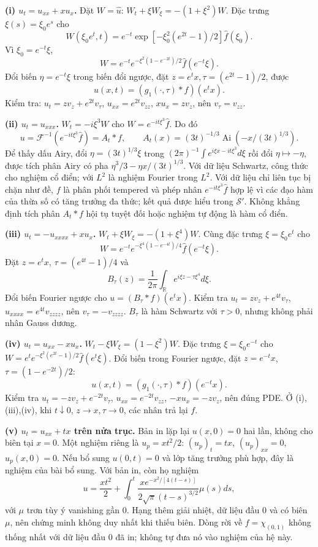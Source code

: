 \documentclass[10pt,a4paper]{article}
\begin{document}
\textbf{(i) $u_t=u_{xx}+xu_x$.}
Đặt $W=\widehat u$: $W_t+\xi W_\xi=-(1+\xi^2)W$. Đặc trưng $\xi(s)=\xi_0e^s$ cho
\[W(\xi_0e^t,t)=e^{-t}\exp[-\xi_0^2(e^{2t}-1)/2]\widehat f(\xi_0).\]
Vì $\xi_0=e^{-t}\xi$,
\[W=e^{-t}e^{-\xi^2(1-e^{-2t})/2}\widehat f(e^{-t}\xi).\]
Đổi biến $\eta=e^{-t}\xi$ trong biến đổi ngược, đặt $z=e^tx,\tau=(e^{2t}-1)/2$, được
\[u(x,t)=(g_1(\cdot,\tau)*f)(e^tx).\]
Kiểm tra: $u_t=zv_z+e^{2t}v_\tau$, $u_{xx}=e^{2t}v_{zz}$, $xu_x=zv_z$, nên $v_\tau=v_{zz}$.

\textbf{(ii) $u_t=u_{xxx}$.}
$W_t=-i\xi^3W$ cho $W=e^{-it\xi^3}\widehat f$. Do đó
\[u=\mathcal F^{-1}(e^{-it\xi^3}\widehat f)=A_t*f,\qquad
A_t(x)=(3t)^{-1/3}\operatorname{Ai}(-x/(3t)^{1/3}).\]
Để thấy dấu Airy, đổi $\eta=(3t)^{1/3}\xi$ trong $(2\pi)^{-1}\int e^{i\xi x-it\xi^3}d\xi$ rồi đổi $\eta\mapsto-\eta$, được tích phân Airy có pha $\eta^3/3-\eta x/(3t)^{1/3}$. Với dữ liệu Schwartz, công thức cho nghiệm cổ điển; với $L^2$ là nghiệm Fourier trong $L^2$. Với dữ liệu chỉ liên tục bị chặn như đề, $f$ là phân phối tempered và phép nhân $e^{-it\xi^3}\widehat f$ hợp lệ vì các đạo hàm của thừa số có tăng trưởng đa thức; kết quả được hiểu trong $\mathcal S'$. Không khẳng định tích phân $A_t*f$ hội tụ tuyệt đối hoặc nghiệm tự động là hàm cổ điển.

\textbf{(iii) $u_t=-u_{xxxx}+xu_x$.}
$W_t+\xi W_\xi=-(1+\xi^4)W$. Cùng đặc trưng $\xi=\xi_0e^t$ cho
\[W=e^{-t}e^{-\xi^4(1-e^{-4t})/4}\widehat f(e^{-t}\xi).\]
Đặt $z=e^tx$, $\tau=(e^{4t}-1)/4$ và
\[B_\tau(z)=\frac1{2\pi}\int_{\mathbb R}e^{i\xi z-\tau\xi^4}d\xi.\]
Đổi biến Fourier ngược cho $u=(B_\tau*f)(e^tx)$. Kiểm tra $u_t=zv_z+e^{4t}v_\tau$, $u_{xxxx}=e^{4t}v_{zzzz}$, nên $v_\tau=-v_{zzzz}$. $B_\tau$ là hàm Schwartz với $\tau>0$, nhưng không phải nhân Gauss dương.

\textbf{(iv) $u_t=u_{xx}-xu_x$.}
$W_t-\xi W_\xi=(1-\xi^2)W$. Đặc trưng $\xi=\xi_0e^{-t}$ cho $W=e^t e^{-\xi^2(e^{2t}-1)/2}\widehat f(e^t\xi)$. Đổi biến trong Fourier ngược, đặt $z=e^{-t}x$, $\tau=(1-e^{-2t})/2$:
\[u(x,t)=(g_1(\cdot,\tau)*f)(e^{-t}x).\]
Kiểm tra $u_t=-zv_z+e^{-2t}v_\tau$, $u_{xx}=e^{-2t}v_{zz}$, $-xu_x=-zv_z$, nên đúng PDE. Ở (i),(iii),(iv), khi $t\downarrow0$, $z\to x,\tau\to0$, các nhân trả lại $f$.

\textbf{(v) $u_t=u_{xx}+tx$ trên nửa trục.}
Bản in lặp lại $u(x,0)=0$ hai lần, không cho biên tại $x=0$. Một nghiệm riêng là $u_p=xt^2/2$: $(u_p)_t=tx$, $(u_p)_{xx}=0$, $u_p(x,0)=0$. Nếu bổ sung $u(0,t)=0$ và lớp tăng trưởng phù hợp, đây là nghiệm của bài bổ sung. Với bản in, còn họ nghiệm
\[u=\frac{xt^2}2+\int_0^t
\frac{x e^{-x^2/[4(t-s)]}}{2\sqrt\pi(t-s)^{3/2}}\mu(s)ds,\]
với $\mu$ trơn tùy ý vanishing gần $0$. Hạng thêm giải nhiệt, dữ liệu đầu $0$ và có biên $\mu$, nên chứng minh không duy nhất khi thiếu biên. Dòng rời về $f=\chi_{(0,1)}$ không thống nhất với dữ liệu đầu $0$ đã in; không tự đưa nó vào nghiệm của hệ này.
\end{document}
